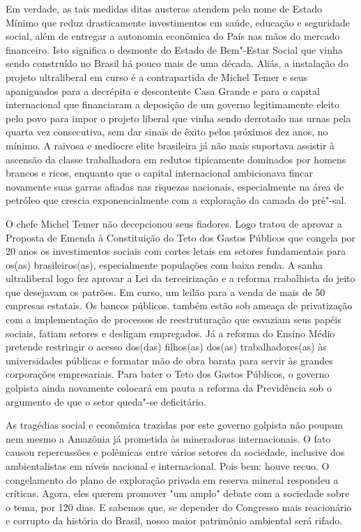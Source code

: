 Em verdade, as tais medidas ditas austeras atendem pelo nome de Estado
Mínimo que reduz drasticamente investimentos em saúde, educação e
seguridade social, além de entregar a autonomia econômica do País nas
mãos do mercado financeiro. Isto significa o desmonte do Estado de
Bem"-Estar Social que vinha sendo construído no Brasil há pouco mais de
uma década. Aliás, a instalação do projeto ultraliberal em curso é a
contrapartida de Michel Temer e seus apaniguados para a decrépita e
descontente Casa Grande e para o capital internacional que financiaram a
deposição de um governo legitimamente eleito pelo povo para impor o
projeto liberal que vinha sendo derrotado nas urnas pela quarta vez
consecutiva, sem dar sinais de êxito pelos próximos dez anos, no mínimo.
A raivosa e medíocre elite brasileira já não mais suportava assistir à
ascensão da classe trabalhadora em redutos tipicamente dominados por
homens brancos e ricos, enquanto que o capital internacional ambicionava
fincar novamente suas garras afiadas nas riquezas nacionais,
especialmente na área de petróleo que crescia exponencialmente com a
exploração da camada do pré"-sal.

O chefe Michel Temer não decepcionou seus fiadores. Logo tratou de
aprovar a Proposta de Emenda à Constituição do Teto dos Gastos Públicos
que congela por 20 anos os investimentos sociais com cortes letais em
setores fundamentais para os(as) brasileiros(as), especialmente
populações com baixa renda. A sanha ultraliberal logo fez aprovar a Lei
da terceirização e a reforma rrabalhista do jeito que desejavam os
patrões. Em curso, um leilão para a venda de mais de 50 empresas
estatais. Os bancos públicos. também estão sob ameaça de privatização
com a implementação de processos de reestruturação que esvaziam seus
papéis sociais, fatiam setores e desligam empregados. Já a reforma do
Ensino Médio pretende restringir o acesso dos(das) filhos(as) dos(as)
trabalhadores(as) às universidades públicas e formatar mão de obra
barata para servir às grandes corporações empresariais. Para bater o
Teto dos Gastos Públicos, o governo golpista ainda novamente colocará em
pauta a reforma da Previdência sob o argumento de que o setor queda"-se
deficitário.

As tragédias social e econômica trazidas por este governo golpista não
poupam nem mesmo a Amazônia já prometida às mineradoras internacionais.
O fato causou repercussões e polêmicas entre vários setores da
sociedade, inclusive dos ambientalistas em níveis nacional e
internacional. Pois bem: houve recuo. O congelamento do plano de
exploração privada em reserva mineral respondeu a críticas. Agora, eles
querem promover "um amplo" debate com a sociedade sobre o tema, por 120
dias. E sabemos que, se depender do Congresso mais reacionário e
corrupto da história do Brasil, nosso maior patrimônio ambiental será
rifado.

